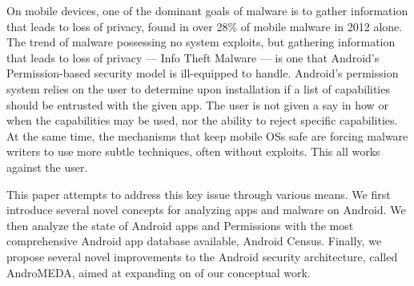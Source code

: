  On mobile devices, one of the dominant goals of malware is to gather information that leads to loss of privacy, found in over 28\% of mobile malware in 2012 alone\citep{nq2013}. The trend of malware possessing no system exploits, but gathering information that leads to loss of privacy --- Info Theft Malware --- is one that Android's Permission-based security model is ill-equipped to handle. Android's permission system relies on the user to determine upon installation if a list of capabilities should be entrusted with the given app. The user is not given a say in how or when the capabilities may be used, nor the ability to reject specific capabilities. At the same time, the mechanisms that keep mobile OSs safe are forcing malware writers to use more subtle techniques, often without exploits. This all works against the user.

This paper attempts to address this key issue through various means. We first introduce several novel concepts for analyzing apps and malware on Android. We then analyze the state of Android apps and Permissions with the most comprehensive Android app database available, Android Census. Finally, we propose several novel improvements to the Android security architecture, called AndroMEDA, aimed at expanding on of our conceptual work.

